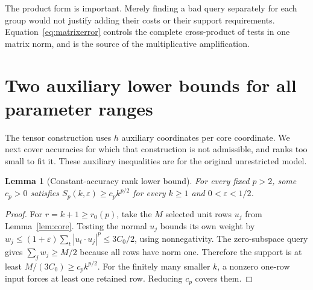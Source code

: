 \documentclass[11pt]{article}
\newtheorem{lemma}[theorem]{Lemma}
\theoremstyle{remark}\newtheorem{remark}[theorem]{Remark}
\newcommand{\eps}{\varepsilon}\newcommand{\norm}[1]{\left\|#1\right\|}
\begin{document}
The product form is important. Merely finding a bad query separately for each group would not justify adding their costs or their support requirements. Equation~\eqref{eq:matrixerror} controls the complete cross-product of tests in one matrix norm, and is the source of the multiplicative amplification.

\section{Two auxiliary lower bounds for all parameter ranges}\label{sec:aux}
The tensor construction uses $h$ auxiliary coordinates per core coordinate. We next cover accuracies for which that construction is not admissible, and ranks too small to fit it. These auxiliary inequalities are for the original unrestricted model.

\begin{lemma}[Constant-accuracy rank lower bound]\label{lem:rank}
For every fixed $p>2$, some $c_p>0$ satisfies
$S_p(k,\eps)\ge c_pk^{p/2}$ for every $k\ge1$ and $0<\eps<1/2$.
\end{lemma}
\begin{proof}
For $r=k+1\ge r_0(p)$, take the $M$ selected unit rows $u_j$ from Lemma~\ref{lem:core}. Testing the normal $u_j$ bounds its own weight by
$w_j\le(1+\eps)\sum_t|u_t\cdot u_j|^p\le3C_0/2$, using nonnegativity. The zero-subspace query gives $\sum_jw_j\ge M/2$ because all rows have norm one. Therefore the support is at least $M/(3C_0)\ge c_pk^{p/2}$. For the finitely many smaller $k$, a nonzero one-row input forces at least one retained row. Reducing $c_p$ covers them.
\end{proof}
\end{document}

